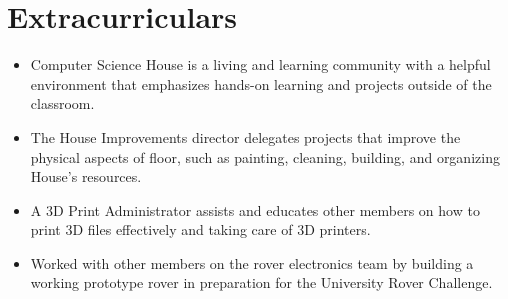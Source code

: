 \documentclass[a4paper]{comcv}
\begin{document}

\section{Extracurriculars}


\begin{itemize}
    \item Computer Science House is a living and learning community with a helpful environment that emphasizes hands-on learning and projects outside of the classroom.

    \item The House Improvements director delegates projects that improve the physical aspects of floor, such as painting, cleaning, building, and organizing House's resources.

	\item A 3D Print Administrator assists and educates other members on how to print 3D files effectively and taking care of 3D printers.
	
\end{itemize}



\begin{itemize}
    \item Worked with other members on the rover electronics team by building a working prototype rover in preparation for the University Rover Challenge. 

\end{itemize}
\end{document}
